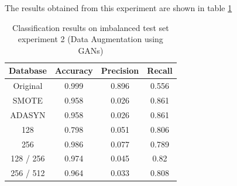 The results obtained from this experiment are shown in table \ref{tab:Classification results on imbalanced test set (Data Augmentation using GANs)}
\begin{table}[H]
    \centering
    \begin{tabular}{|c|c|c|c|}
         \hline
         Database
         & Accuracy
         & Precision 
         & Recall \\
         \hline
         Original & 0.999 & 0.896 & 0.556\\
         SMOTE & 0.958 & 0.026 & 0.861 \\
         ADASYN & 0.958 & 0.026 & 0.861 \\
         128 & 0.798 & 0.051 & 0.806 \\
         256 & 0.986 & 0.077 & 0.789 \\
         128 / 256 & 0.974 & 0.045 & 0.82 \\
         256 / 512 & 0.964 & 0.033 & 0.808\\
         \hline
    \end{tabular}
    \caption{Classification results on imbalanced test set experiment 2 (Data Augmentation using GANs)\cite{litReviewGanDataAugmentation}}
    \label{tab:Classification results on imbalanced test set (Data Augmentation using GANs)}
\end{table}

